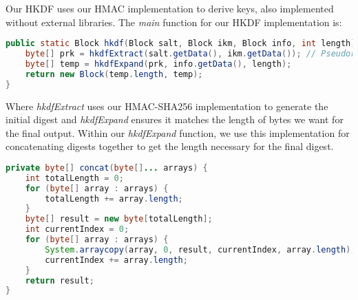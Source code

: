 Our HKDF uses our HMAC implementation to derive keys, also implemented without external libraries. The \textit{main} function for our HKDF implementation is:
\begin{lstlisting}[language=Java]
public static Block hkdf(Block salt, Block ikm, Block info, int length) {
    byte[] prk = hkdfExtract(salt.getData(), ikm.getData()); // Pseudorandom key
    byte[] temp = hkdfExpand(prk, info.getData(), length);
    return new Block(temp.length, temp);
}
\end{lstlisting}
Where \textit{hkdfExtract} uses our HMAC-SHA256 implementation to generate the initial digest and \textit{hkdfExpand} ensures it matches the length of bytes we want for the final output. Within our \textit{hkdfExpand} function, we use this implementation for concatenating digests together to get the length necessary for the final digest.
\begin{lstlisting}[language=Java]
private byte[] concat(byte[]... arrays) {
    int totalLength = 0;
    for (byte[] array : arrays) {
        totalLength += array.length;
    }
    byte[] result = new byte[totalLength];
    int currentIndex = 0;
    for (byte[] array : arrays) {
        System.arraycopy(array, 0, result, currentIndex, array.length);
        currentIndex += array.length;
    }
    return result;
}
\end{lstlisting}


